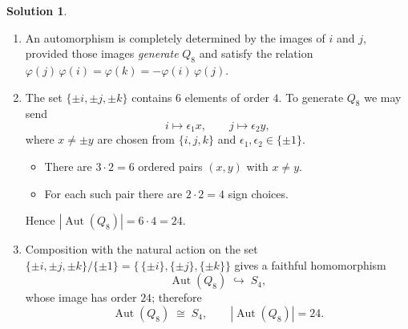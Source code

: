 \documentclass[12pt]{article}
\DeclareMathOperator{\Aut}{Aut}
\theoremstyle{definition} %
\newtheorem{solution}{Solution}
\theoremstyle{plain} %
\begin{document}
\begin{solution}
                          \begin{enumerate}[label=\arabic*., leftmargin=*]
                          \item An automorphism is completely determined by the images of \(i\)
                                and \(j\), provided those images \emph{generate} \(Q_{8}\) and
                                satisfy the relation
                                \(\varphi(j)\,\varphi(i)=\varphi(k)=-\varphi(i)\,\varphi(j)\).
                          
                          \item The set
                                \(\{\pm i,\pm j,\pm k\}\) contains \(6\) elements of order \(4\).
                                To generate \(Q_{8}\) we may send
                                \[
                                    i \longmapsto \epsilon_{1}x, \qquad
                                    j \longmapsto \epsilon_{2}y,
                                \]
                                where
                                \(x\neq \pm y\) are chosen from \(\{i,j,k\}\)
                                and \(\epsilon_{1},\epsilon_{2}\in\{\pm1\}\).
                                \begin{itemize}
                                   \item There are \(3\cdot2=6\) ordered pairs
                                         \((x,y)\) with \(x\neq y\).
                                   \item For each such pair there are \(2\cdot2=4\) sign choices.
                                \end{itemize}
                                Hence \(|\Aut(Q_{8})| = 6\cdot4 = 24\).
                          
                          \item Composition with the natural action on the set
                                \(\{\pm i,\pm j,\pm k\}/\{\pm1\}=\{\,\{\pm i\},\{\pm j\},\{\pm k\}\}\)
                                gives a faithful homomorphism
                                \[
                                    \Aut(Q_{8})\;\hookrightarrow\;S_{4},
                                \]
                                whose image has order \(24\); therefore
                                \[
                                    \boxed{\;
                                       \Aut(Q_{8})\;\cong\;S_{4},\qquad
                                       |\Aut(Q_{8})|=24 .
                                    \;}
                                \]
                          \end{enumerate}
                          \end{solution}
\end{document}
